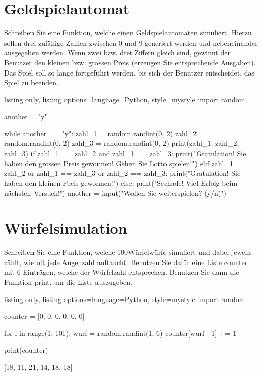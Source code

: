 \documentclass[11pt, oneside]{book}
\begin{document}
\section{Geldspielautomat}
Schreiben Sie eine Funktion, welche einen Geldspielautomaten simuliert. Hierzu sollen drei zufällige Zahlen zwischen 0 und 9 generiert werden und nebeneinander ausgegeben werden. Wenn zwei bzw. drei Ziffern gleich sind, gewinnt der Benutzer den kleinen bzw. grossen Preis (erzeugen Sie entsprechende Ausgaben). Das Spiel soll so lange fortgef\"uhrt werden, bis sich der Benutzer entscheidet, das Spiel zu beenden.
\begin{tcblisting}{listing only, listing options={language=Python, style=mystyle}}
import random

another = "y"

while another == "y":
    zahl_1 = random.randint(0, 2)
    zahl_2 = random.randint(0, 2)
    zahl_3 = random.randint(0, 2)
    print(zahl_1, zahl_2, zahl_3)
    if zahl_1 == zahl_2 and zahl_1 == zahl_3:
        print("Gratulation! Sie haben den grossen Preis gewonnen! Gehen Sie Lotto spielen!")
    elif zahl_1 == zahl_2 or zahl_1 == zahl_3 or zahl_2 == zahl_3:
        print("Gratulation! Sie haben den kleinen Preis gewonnen!")
    else:
        print("Scchade! Viel Erfolg beim nächsten Versuch!")
    another = input("Wollen Sie weiterspielen? (y/n)")
\end{tcblisting}

\section{Würfelsimulation}
Schreiben Sie eine Funktion, welche 100W\"urfelw\"urfe simuliert und dabei jeweils zählt, wie oft jede Augenzahl auftaucht. Benutzen Sie daf\"ur eine Liste counter mit 6 Einträgen, welche der W\"urfelzahl entsprechen. Benutzen Sie dann die Funktion print, um die Liste auszugeben.
\begin{tcblisting}{listing only, listing options={language=Python, style=mystyle}}
import random

counter = [0, 0, 0, 0, 0, 0]

for i in range(1, 101):
    wurf = random.randint(1, 6)
    counter[wurf - 1] += 1

print(counter)

[18, 11, 21, 14, 18, 18]
\end{tcblisting}

\newpage
\end{document}
